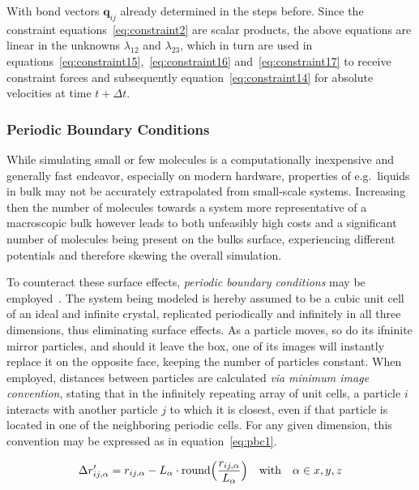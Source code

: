 \documentclass[11pt]{article}
\begin{document}
\bigskip

\noindent With bond vectors $\mathbf{q}_{ij}$ already determined in the steps before. Since the constraint equations~\ref{eq:constraint2} are scalar products, the above equations are linear in the unknowns $\lambda_{12}$ and $\lambda_{23}$, which in turn are used in equations~\ref{eq:constraint15},~\ref{eq:constraint16} and~\ref{eq:constraint17} to receive constraint forces and subsequently equation~\ref{eq:constraint14} for absolute velocities at time $t + \Delta t$.

\subsubsection{Periodic Boundary Conditions}
While simulating small or few molecules is a computationally inexpensive and generally fast endeavor, especially on modern hardware, properties of e.g.~liquids in bulk may not be accurately extrapolated from small-scale systems. Increasing then the number of molecules towards a system more representative of a macroscopic bulk however leads to both unfeasibly high costs and a significant number of molecules being present on the bulks surface, experiencing different potentials and therefore skewing the overall simulation.
\\ \par \noindent To counteract these surface effects, \textit{periodic boundary conditions} may be employed~\cite{Allen2017,Cramer2004-vy,Tuckerman2010}. The system being modeled is hereby assumed to be a cubic unit cell of an ideal and infinite crystal, replicated periodically and infinitely in all three dimensions, thus eliminating surface effects. As a particle moves, so do its ifninite mirror particles, and should it leave the box, one of its images will instantly replace it on the opposite face, keeping the number of particles constant. When employed, distances between particles are calculated \textit{via} \textit{minimum image convention}, stating that in the infinitely repeating array of unit cells, a particle $i$ interacts with another particle $j$ to which it is closest, even if that particle is located in one of the neighboring periodic cells. For any given dimension, this convention may be expressed as in equation~\ref{eq:pbc1}.

\begin{equation}
  \Delta r_{ij,\alpha}' = r_{ij,\alpha} - L_\alpha\cdot \text{round}\Bigl(\frac{r_{ij,\alpha}}{L_\alpha}\Bigr) \quad \text{with} \quad \alpha \in x, y, z
  \label{eq:pbc1}
\end{equation}
\end{document}
